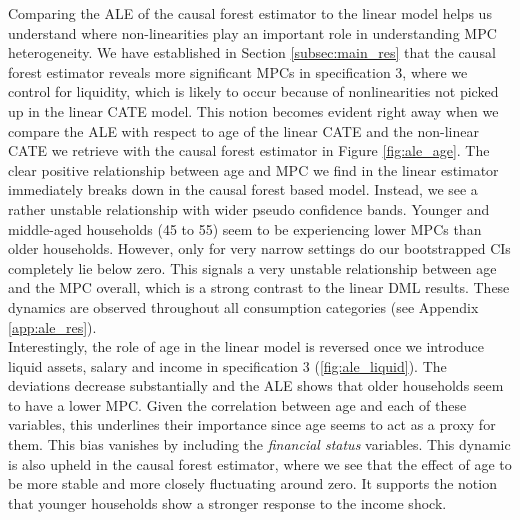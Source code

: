 Comparing the ALE of the causal forest estimator to the linear model helps us understand where non-linearities play an important role in understanding MPC heterogeneity. We have established in Section \ref{subsec:main_res} that the causal forest estimator reveals more significant MPCs in specification 3, where we control for liquidity, which is likely to occur because of nonlinearities not picked up in the linear CATE model. This notion becomes evident right away when we compare the ALE with respect to age of the linear CATE and the non-linear CATE we retrieve with the causal forest estimator in Figure \ref{fig:ale_age}. The clear positive relationship between age and MPC we find in the linear estimator immediately breaks down in the causal forest based model. Instead, we see a rather unstable relationship with wider pseudo confidence bands. Younger and middle-aged households (45 to 55) seem to be experiencing lower MPCs than older households. However, only for very narrow settings do our bootstrapped CIs completely lie below zero. This signals a very unstable relationship between age and the MPC overall, which is a strong contrast to the linear DML results. These dynamics are observed throughout all consumption categories (see Appendix \ref{app:ale_res}). \\
Interestingly, the role of age in the linear model is reversed once we introduce liquid assets, salary and income in specification 3 (\ref{fig:ale_liquid}). The deviations decrease substantially and the ALE shows that older households seem to have a lower MPC. Given the correlation between age and each of these variables, this underlines their importance since age seems to act as a proxy for them. This bias vanishes by including the \textit{financial status} variables. This dynamic is also upheld in the causal forest estimator, where we see that the effect of age to be more stable and more closely fluctuating around zero. It supports the notion that younger households show a stronger response to the income shock. \\
